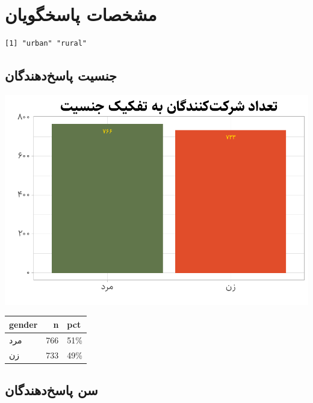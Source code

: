 \documentclass[
]{article}
\begin{document}
\newpage

\hypertarget{ux645ux634ux62eux635ux627ux62a-ux67eux627ux633ux62eux6afux648ux6ccux627ux646}{%
\section{مشخصات
پاسخگویان}\label{ux645ux634ux62eux635ux627ux62a-ux67eux627ux633ux62eux6afux648ux6ccux627ux646}}

\begin{verbatim}
[1] "urban" "rural"
\end{verbatim}

\hypertarget{ux62cux646ux633ux6ccux62a-ux67eux627ux633ux62eux62fux647ux646ux62fux6afux627ux646}{%
\subsection{جنسیت
پاسخ‌دهندگان}\label{ux62cux646ux633ux6ccux62a-ux67eux627ux633ux62eux62fux647ux646ux62fux6afux627ux646}}

\begin{center}\includegraphics{figure/unnamed-chunk-3-1} \end{center}

\begin{longtable}[]{@{}lrl@{}}
\toprule
gender & n & pct \\
\midrule
\endhead
مرد & 766 & 51\% \\
زن & 733 & 49\% \\
\bottomrule
\end{longtable}

\hypertarget{ux633ux646-ux67eux627ux633ux62eux62fux647ux646ux62fux6afux627ux646}{%
\subsection{سن
پاسخ‌دهندگان}\label{ux633ux646-ux67eux627ux633ux62eux62fux647ux646ux62fux6afux627ux646}}
\end{document}
